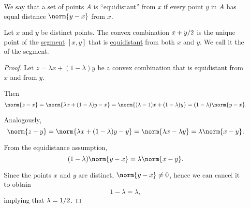 \begin{definition}\label{def:equidistant_points}
  We say that a set of points \( A \) is \enquote{equidistant} from \( x \) if every point \( y \) in \( A \) has equal distance \( \norm{y - x} \) from \( x \).
\end{definition}

\begin{proposition}\label{thm:segment_midpoint}
  Let \( x \) and \( y \) be distinct points. The convex combination \( \ifrac {x + y} 2 \) is the unique point of the \hyperref[def:line_segment]{segment} \( [x, y] \) that is \hyperref[def:equidistant_points]{equidistant} from both \( x \) and \( y \). We call it the  of the segment.
\end{proposition}
\begin{proof}
  Let \( z = \lambda x + (1 - \lambda) y \) be a convex combination that is equidistant from \( x \) and from \( y \).

  Then
  \begin{equation*}
    \norm{ z - x }
    =
    \norm{ \lambda x + (1 - \lambda) y - x }
    =
    \norm{ (\lambda - 1) x + (1 - \lambda) y }
    =
    (1 - \lambda) \norm{ y - x }.
  \end{equation*}

  Analogously,
  \begin{equation*}
    \norm{ z - y }
    =
    \norm{ \lambda x + (1 - \lambda) y - y }
    =
    \norm{ \lambda x - \lambda y }
    =
    \lambda \norm{ x - y }.
  \end{equation*}

  From the equidistance assumption,
  \begin{equation*}
    (1 - \lambda) \norm{ y - x } = \lambda \norm{ x - y }.
  \end{equation*}

  Since the points \( x \) and \( y \) are distinct, \( \norm{ y - x } \neq 0 \), hence we can cancel it to obtain
  \begin{equation*}
    1 - \lambda = \lambda,
  \end{equation*}
  implying that \( \lambda = \ifrac 1 2 \).
\end{proof}
